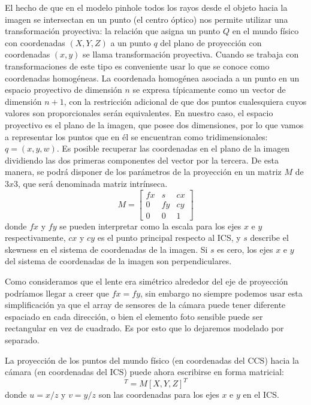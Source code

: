 El hecho de que en el modelo pinhole todos los rayos desde el objeto hacia la imagen se intersectan en un punto (el centro óptico) nos permite utilizar una transformación proyectiva: la relación que asigna un punto $Q$ en el mundo físico con coordenadas $(X, Y, Z)$ a un punto $q$ del plano de proyección con coordenadas $(x, y)$ se llama transformación proyectiva. Cuando se trabaja con transformaciones de este tipo es conveniente usar lo que se conoce como coordenadas homogéneas. La coordenada homogénea asociada a un punto en un espacio proyectivo de dimensión $n$ se expresa típicamente como un vector de dimensión $n+1$, con la restricción adicional de que dos puntos cualesquiera cuyos valores son proporcionales serán equivalentes. En nuestro caso, el espacio proyectivo es el plano de la imagen, que posee dos dimensiones, por lo que vamos a representar los puntos que en él se encuentran como tridimensionales: $q = (x, y, w)$. Es posible recuperar las coordenadas en el plano de la imagen dividiendo las dos primeras componentes del vector por la tercera. De esta manera, se podrá disponer de los parámetros de la proyección en un matriz $M$ de $3x3$, que será denominada matriz intrínseca.
\begin{equation*}
    M =
    \begin{bmatrix}
        fx &  s & cx \\
         0 & fy & cy \\
         0 &  0 &  1
    \end{bmatrix}
\end{equation*}
donde $fx$ y $fy$ se pueden interpretar como la escala para los ejes $x$ e $y$ respectivamente, $cx$ y $cy$ es el punto principal respecto al ICS, y $s$ describe el skewness en el sistema de coordenadas de la imagen. Si $s$ es cero, los ejes $x$ e $y$ del sistema de coordenadas de la imagen son perpendiculares.

Como consideramos que el lente era simétrico alrededor del eje de proyección podríamos llegar a creer que $fx = fy$, sin embargo no siempre podemos usar esta simplificación ya que el array de sensores de la cámara puede tener diferente espaciado en cada dirección, o bien el elemento foto sensible puede ser rectangular en vez de cuadrado. Es por esto que lo dejaremos modelado por separado.

La proyección de los puntos del mundo físico (en coordenadas del CCS) hacia la cámara (en coordenadas del ICS) puede ahora escribirse en forma matricial:
\begin{equation*}
	[u, v, 1]^T = M [X, Y, Z]^T
\end{equation*}	
donde $u = x/z$ y $v = y/z$ son las coordenadas para los ejes $x$ e $y$ en el ICS.

